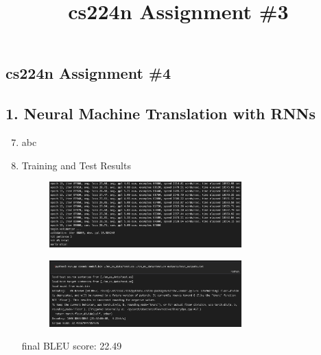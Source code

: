 \documentclass[a4paper]{article}
\title{cs224n Assignment \#3}
\date{}
\author{}
\begin{document}
\begin{center}
    \section*{cs224n Assignment \#4}
\end{center}
\medskip


\subsection*{1. Neural Machine Translation with RNNs}

    \begin{enumerate}[label=(\alph*)]
        \setcounter{enumi}{6}        
        \item abc

        \setcounter{enumi}{8}
        \item Training and Test Results
        \begin{figure}[h]
            \centering
            \includegraphics[width=0.7\textwidth]{NMT_train_complete.png}
            \label{fig:training completed after 5 hours}
        \end{figure}
        
        \begin{figure}[h]
            \centering
            \includegraphics[width=0.7\textwidth]{NMT_BLEU_22.49.png}
            \label{fig:BLEU score 22.49}
        \end{figure}

        final BLEU score: 22.49
        

\end{enumerate}
\end{document}
